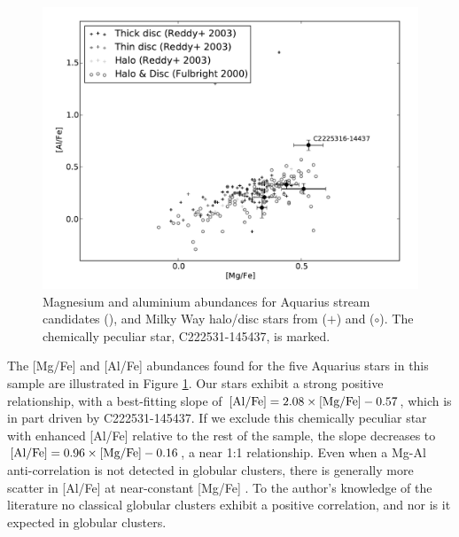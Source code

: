 \documentclass{emulateapj}
\begin{document}
\begin{figure}[h!]
	\includegraphics[width=\columnwidth]{./figures/aquarius-mg-al.pdf}
	\caption{Magnesium and aluminium abundances for Aquarius stream candidates (\textbullet), and Milky Way halo/disc stars from \citet{reddy;et-al_2003} ($+$) and \citet{fulbright_2000} ($\circ$). The chemically peculiar star, {C222531-145437}, is marked.}
	\label{fig:mg-al}
\end{figure}



The [Mg/Fe] and [Al/Fe] abundances found for the five Aquarius stars in this sample are illustrated in Figure \ref{fig:mg-al}. Our stars exhibit a strong positive relationship, with a best-fitting slope of ${{\rm [Al/Fe]} = 2.08\times\mbox{[Mg/Fe]} - 0.57}$, which is in part driven by {C222531-145437}. If we exclude this chemically peculiar star with enhanced [Al/Fe] relative to the rest of the sample, the slope decreases to {${\rm [Al/Fe]} = 0.96\times\mbox{[Mg/Fe]} - 0.16$}, a near 1:1 relationship. Even when a {Mg-Al} anti-correlation is not detected in globular clusters, there is generally more scatter in [Al/Fe] at near-constant [Mg/Fe] \citep[e.g. see Figure \ref{fig:mg-al} or ][]{carretta;et-al_2009a}. To the author's knowledge of the literature no classical globular clusters exhibit a positive correlation, and nor is it expected in globular clusters.
\end{document}
